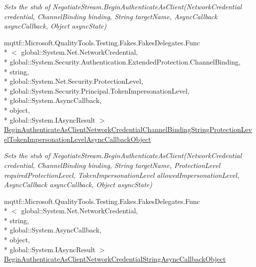 \begin{DoxyCompactItemize}
\begin{DoxyCompactList}\small\item\em Sets the stub of Negotiate\-Stream.\-Begin\-Authenticate\-As\-Client(\-Network\-Credential credential, Channel\-Binding binding, String target\-Name, Async\-Callback async\-Callback, Object async\-State)\end{DoxyCompactList}\item 
mqttf\-::\-Microsoft.\-Quality\-Tools.\-Testing.\-Fakes.\-Fakes\-Delegates.\-Func\\*
$<$ global\-::\-System.\-Net.\-Network\-Credential, \\*
global\-::\-System.\-Security.\-Authentication.\-Extended\-Protection.\-Channel\-Binding, \\*
string, \\*
global\-::\-System.\-Net.\-Security.\-Protection\-Level, \\*
global\-::\-System.\-Security.\-Principal.\-Token\-Impersonation\-Level, \\*
global\-::\-System.\-Async\-Callback, \\*
object, \\*
global\-::\-System.\-I\-Async\-Result $>$ \hyperlink{class_system_1_1_net_1_1_security_1_1_fakes_1_1_stub_negotiate_stream_a1953533a6263475648a88e5ae7f9f8db}{Begin\-Authenticate\-As\-Client\-Network\-Credential\-Channel\-Binding\-String\-Protection\-Level\-Token\-Impersonation\-Level\-Async\-Callback\-Object}
\begin{DoxyCompactList}\small\item\em Sets the stub of Negotiate\-Stream.\-Begin\-Authenticate\-As\-Client(\-Network\-Credential credential, Channel\-Binding binding, String target\-Name, Protection\-Level required\-Protection\-Level, Token\-Impersonation\-Level allowed\-Impersonation\-Level, Async\-Callback async\-Callback, Object async\-State)\end{DoxyCompactList}\item 
mqttf\-::\-Microsoft.\-Quality\-Tools.\-Testing.\-Fakes.\-Fakes\-Delegates.\-Func\\*
$<$ global\-::\-System.\-Net.\-Network\-Credential, \\*
string, \\*
global\-::\-System.\-Async\-Callback, \\*
object, \\*
global\-::\-System.\-I\-Async\-Result $>$ \hyperlink{class_system_1_1_net_1_1_security_1_1_fakes_1_1_stub_negotiate_stream_a536ef382ed5266bccd400b9739ecd7f3}{Begin\-Authenticate\-As\-Client\-Network\-Credential\-String\-Async\-Callback\-Object}

\end{DoxyCompactItemize}
